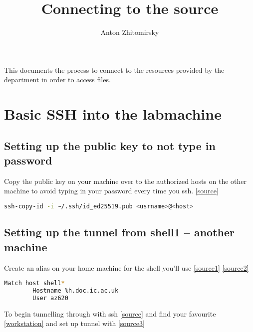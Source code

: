 \documentclass[11pt]{article}
\title{Connecting to the source}
\author{Anton Zhitomirsky}
\begin{document}
\maketitle

This documents the process to connect to the resources provided by the department in order to access files.

\section*{Basic SSH into the labmachine}

\subsection*{Setting up the public key to not type in password}

Copy the public key on your machine over to the authorized hosts on the other machine to avoid typing in your password every time you ssh. \href{https://superuser.com/questions/8077/how-do-i-set-up-ssh-so-i-dont-have-to-type-my-password}{[source]}

\begin{lstlisting}[language=sh]
    ssh-copy-id -i ~/.ssh/id_ed25519.pub <usrname>@<host>
\end{lstlisting}

\subsection*{Setting up the tunnel from shell1 -- another machine}

Create an alias on your home machine for the shell you'll use \href{https://ostechnix.com/how-to-create-ssh-alias-in-linux/}{[source1]} \href{https://stackoverflow.com/questions/17169292/using-only-part-of-a-pattern-in-ssh-config-hostname}{[source2]}

\begin{lstlisting}[language=bash]
    Match host shell*
        Hostname %h.doc.ic.ac.uk
        User az620
\end{lstlisting}

\noindent To begin tunnelling through with ssh \href{https://www.imperial.ac.uk/computing/csg/guides/remote-access/ssh/}{[source]} and find your favourite \href{https://www.imperial.ac.uk/computing/people/csg/facilities/lab/workstations/}{[workstation]} and set up tunnel with \href{https://superuser.com/questions/107679/forward-ssh-traffic-through-a-middle-machine}{[source3]}
\end{document}
